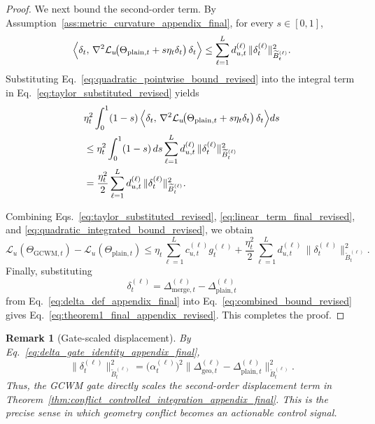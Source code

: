 \documentclass{article}
\newtheorem{remark}{Remark}
\begin{document}
\begin{proof}
We next bound the second-order term. By Assumption~\ref{ass:metric_curvature_appendix_final}, for every \(s\in[0,1]\),
\begin{equation}
\Bigl\langle
\delta_t,\,
\nabla^2\mathcal L_u\!\bigl(\Theta_{\mathrm{plain},t}+s\eta_t\delta_t\bigr)\,
\delta_t
\Bigr\rangle
\le
\sum_{\ell=1}^L
d_{u,t}^{(\ell)}
\,
\|\delta_t^{(\ell)}\|_{\widetilde B_t^{(\ell)}}^2.
\label{eq:quadratic_pointwise_bound_revised}
\end{equation}
Substituting Eq.~\eqref{eq:quadratic_pointwise_bound_revised} into the integral term in Eq.~\eqref{eq:taylor_substituted_revised} yields
\begin{align}
&\eta_t^2
\int_0^1 (1-s)\,
\Bigl\langle
\delta_t,\,
\nabla^2\mathcal L_u\!\bigl(\Theta_{\mathrm{plain},t}+s\eta_t\delta_t\bigr)\,
\delta_t
\Bigr\rangle ds
\nonumber\\
&\le
\eta_t^2
\int_0^1 (1-s)\,ds
\sum_{\ell=1}^L
d_{u,t}^{(\ell)}
\,
\|\delta_t^{(\ell)}\|_{\widetilde B_t^{(\ell)}}^2
\nonumber\\
&=
\frac{\eta_t^2}{2}
\sum_{\ell=1}^L
d_{u,t}^{(\ell)}
\,
\|\delta_t^{(\ell)}\|_{\widetilde B_t^{(\ell)}}^2.
\label{eq:quadratic_integrated_bound_revised}
\end{align}

Combining Eqs.~\eqref{eq:taylor_substituted_revised}, \eqref{eq:linear_term_final_revised}, and \eqref{eq:quadratic_integrated_bound_revised}, we obtain
\begin{equation}
\mathcal L_u(\Theta_{\mathrm{GCWM},t})
-
\mathcal L_u(\Theta_{\mathrm{plain},t})
\le
\eta_t \sum_{\ell=1}^L c_{u,t}^{(\ell)} g_t^{(\ell)}
+
\frac{\eta_t^2}{2}
\sum_{\ell=1}^L
d_{u,t}^{(\ell)}
\,
\|\delta_t^{(\ell)}\|_{\widetilde B_t^{(\ell)}}^2.
\label{eq:combined_bound_revised}
\end{equation}
Finally, substituting
\[
\delta_t^{(\ell)}
=
\Delta_{\mathrm{merge},t}^{(\ell)}-\Delta_{\mathrm{plain},t}^{(\ell)}
\]
from Eq.~\eqref{eq:delta_def_appendix_final} into Eq.~\eqref{eq:combined_bound_revised} gives Eq.~\eqref{eq:theorem1_final_appendix_revised}. This completes the proof.
\end{proof}

\begin{remark}[Gate-scaled displacement]
\label{rem:gate_scaled_displacement_revised}
By Eq.~\eqref{eq:delta_gate_identity_appendix_final},
\begin{equation}
\|\delta_t^{(\ell)}\|_{\widetilde B_t^{(\ell)}}^2
=
\bigl(\alpha_t^{(\ell)}\bigr)^2
\bigl\|
\Delta_{\mathrm{geo},t}^{(\ell)}-\Delta_{\mathrm{plain},t}^{(\ell)}
\bigr\|_{\widetilde B_t^{(\ell)}}^2.
\label{eq:gate_scaled_displacement_revised}
\end{equation}
Thus, the GCWM gate directly scales the second-order displacement term in Theorem~\ref{thm:conflict_controlled_integration_appendix_final}. This is the precise sense in which geometry conflict becomes an actionable control signal.
\end{remark}
\end{document}
